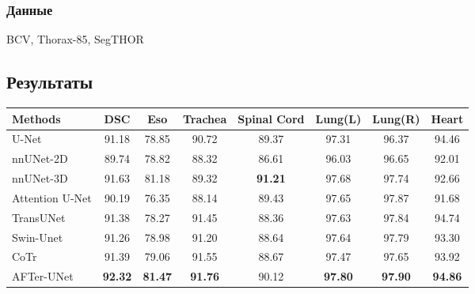 \subsubsection*{Данные}
BCV, Thorax-85, SegTHOR
\subsection*{Результаты}



{\small

\begin{center}
    \begin{tabular}{l|c|cccccc}
        \toprule
        Methods & DSC & Eso & Trachea & Spinal Cord & Lung(L) & Lung(R) & Heart\\
        \midrule
        U-Net& 91.18 & 78.85 & 90.72 & 89.37 & 97.31 & 96.37 & 94.46 \\
        nnUNet-2D& 89.74 & 78.82 & 88.32 & 86.61 & 96.03 & 96.65 & 92.01 \\ 
        nnUNet-3D& 91.63 & 81.18 & 89.32 & \textbf{91.21} & 97.68 & 97.74 & 92.66 \\ 
        Attention U-Net & 90.19 & 76.35 & 88.14 & 89.43 & 97.65 & 97.87 & 91.68\\
        TransUNet & 91.38 & 78.27 & 91.45 & 88.36 & 97.63 & 97.84 & 94.74 \\  
        Swin-Unet & 91.26 & 78.98 & 91.20 & 88.64 & 97.64 & 97.79 & 93.30 \\  
        CoTr& 91.39 & 79.06 & 91.55 & 88.67 & 97.47 & 97.65 & 93.92 \\  
        \hline
        AFTer-UNet & \textbf{92.32} & \textbf{81.47} & \textbf{91.76} & 90.12 & \textbf{97.80} & \textbf{97.90} & \textbf{94.86}\\ 
        \bottomrule
        \end{tabular}
\end{center}

}


\newpage

